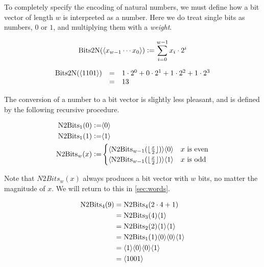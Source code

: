 To completely specify the encoding of natural numbers, we must define
how a bit vector of length $w$ is interpreted as a number.  Here we do
treat single bits as numbers, $0$ or $1$, and multiplying them with a
\emph{weight}.

\begin{definition}
\begin{align*}
    \mathrm{Bits2N}(\langle x_{w-1}\cdots x_{0} \rangle) \vcentcolon= \sum_{i=0}^{w-1} x_{i} \cdot{} 2^{i}
\end{align*}
\label{def:bits2n}
\end{definition}

\begin{example}
  \[
    \begin{array}{rcl}
      \mathrm{Bits2N}(\langle 1101 \rangle) & = & 1 \cdot 2^{0} + 0 \cdot 2^{1} + 1 \cdot 2^{2} + 1 \cdot 2^{3} \\
                               & = & 13
    \end{array}
  \]
\end{example}

The conversion of a number to a bit vector is slightly less pleasant,
and is defined by the following recursive procedure.

\begin{definition}
  \begin{align}
    \mathrm{N2Bits}_{1}(0) \vcentcolon= & \langle 0 \rangle \\
    \mathrm{N2Bits}_{1}(1) \vcentcolon= & \langle 1 \rangle \\
    \mathrm{N2Bits}_{w}(x) \vcentcolon= &
                                    \begin{cases}
                                      \langle \mathrm{N2Bits}_{w-1}(\lfloor\frac{x}{2}\rfloor) \rangle\langle 0 \rangle & \text{$x$ is even} \\
                                      \langle \mathrm{N2Bits}_{w-1}(\lfloor\frac{x}{2}\rfloor) \rangle\langle 1 \rangle & \text{$x$ is odd}
                                    \end{cases}
  \end{align}
\end{definition}

Note that $N2Bits_{w}(x)$ always produces a bit vector with $w$ bits,
no matter the magnitude of $x$.  We will return to this in
\cref{sec:words}.

  \begin{example}
\begin{align}
  \mathrm{N2Bits}_{4}(9) &= \mathrm{N2Bits}_{4}(2\cdot{}4 + 1) \\
            &= \mathrm{N2Bits}_{3}(4) \langle 1 \rangle \\
            &= \mathrm{N2Bits}_{2}(2) \langle 1 \rangle \langle 1 \rangle \\
            &= \mathrm{N2Bits}_{1}(1) \langle 0 \rangle \langle 0 \rangle \langle 1 \rangle \\
            &= \langle 1 \rangle \langle 0 \rangle \langle 0 \rangle \langle 1 \rangle \\
            &= \langle 1001 \rangle
\end{align}
  \end{example}

